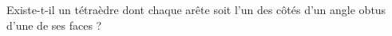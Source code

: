 Existe-t-il un tétraèdre dont chaque arête soit l'un des côtés d'un angle obtus d'une de ses faces ?
